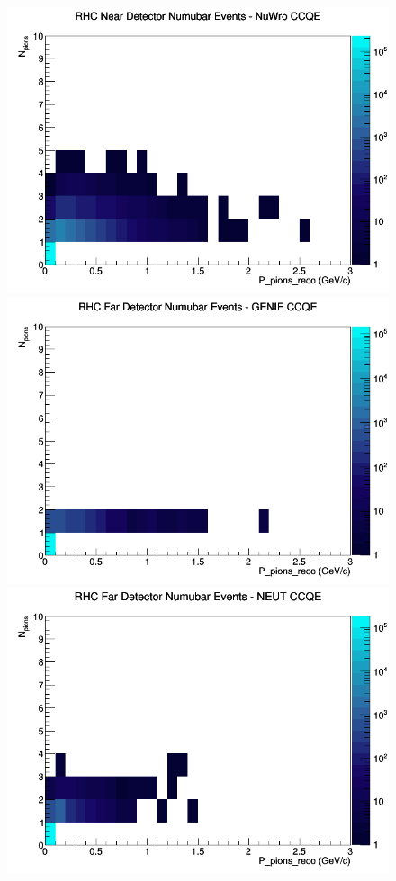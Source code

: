 \documentclass[12pt]{article}
\begin{document}
\begin{figure}[h]
\includegraphics[width=\linewidth]{eff_N_P/LAr/pions/CCQE_RHC_ND_numubar_N_P_NuWro.png}
\endminipage
\newline
{}
\includegraphics[width=\linewidth]{eff_N_P/LAr/pions/CCQE_RHC_FD_numubar_N_P_GENIE.png}
\endminipage
{}
\includegraphics[width=\linewidth]{eff_N_P/LAr/pions/CCQE_RHC_FD_numubar_N_P_NEUT.png}

\end{figure}
\end{document}

